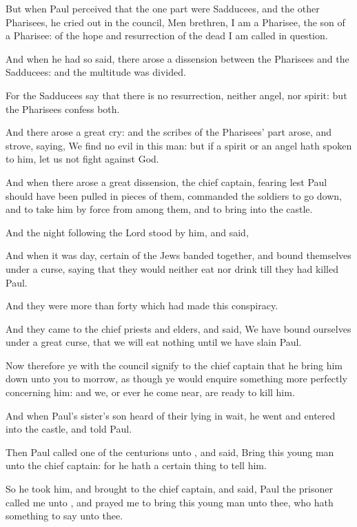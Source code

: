 {But when
Paul
perceived
that the
one
part
were
Sadducees,
and the
other
Pharisees, he cried
out
in the
council,
Men
{}
brethren,
I
am a
Pharisee, the
son of a
Pharisee:
of the
hope
and
resurrection of the
dead
I am called in
question.

And
when
he had so
said, there
arose a
dissension between the
Pharisees
and the
Sadducees:
and the
multitude was
divided.

For the
Sadducees say
that there
is
no
resurrection,
neither
angel,
nor
spirit:
but the
Pharisees
confess
both.

And there
arose a
great
cry:
and the
scribes
{} of the
Pharisees’
part
arose, and
strove,
saying, We
find
no
evil
in
this
man:
but
if a
spirit
or an
angel hath
spoken to
him, let
us
not fight against
God.

And when there
arose a
great
dissension, the chief
captain,
fearing
lest
Paul should have been pulled in
pieces
of
them,
commanded the
soldiers to go
down, and to
take
him by
force
from
among
them,
and to
bring
{}
into the
castle.

And the
night
following the
Lord
stood by
him, and
said,
{}

And when it
was
day,
certain of the
Jews
banded
together, and
bound
themselves under a
curse, saying
that they
would
neither
eat
nor
drink
till they had
killed
Paul.

And they
were
more than
forty
which had
made
this
conspiracy.

And
they
came to the chief
priests
and
elders, and
said, We have
bound
ourselves under a great
curse, that we will
eat
nothing
until we have
slain
Paul.

Now
therefore
ye
with the
council
signify to the chief
captain
that he
bring
him
down
unto
you to
morrow, as
though ye
would
enquire something more
perfectly
concerning
him:
and
we, or
ever
he come
near,
are
ready to
kill
him.

And
when
Paul’s
sister’s
son
heard of their lying in
wait, he
went
and
entered
into the
castle, and
told
Paul.

Then
Paul
called
one of the
centurions unto
{}, and
said,
Bring
this young
man
unto the chief
captain:
for he
hath a certain
thing to
tell
him.

So he
took
him, and
brought
{}
to the chief
captain,
and
said,
Paul the
prisoner
called
me
unto
{}, and prayed
me to
bring
this young
man
unto
thee, who
hath
something to
say unto
thee.

}
